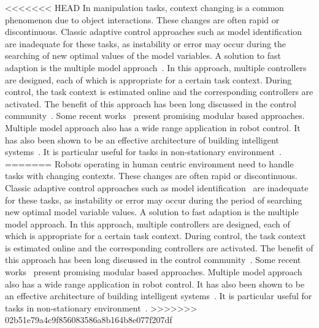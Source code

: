 <<<<<<< HEAD
In manipulation tasks, context changing is a common phenomenon due to object interactions. These changes are often rapid or discontinuous. Classic adaptive control approaches such as model identification~\cite{khalil2004modeling} are inadequate for these tasks, as instability or error may occur during the searching of new optimal values of the model variables. A solution to fast adaption is the multiple model approach~\cite{narendra1995adaptation}. In this approach, multiple controllers are designed, each of which is appropriate for a certain task context. During control, the task context is estimated online and the corresponding controllers are activated. The benefit of this approach has been long discussed in the control community~\cite{jacobs1991adaptive,narendra1997adaptive}. Some recent works~\cite{fekri2007robust,kuipers2010multiple} present promising modular based approaches. Multiple model approach also has a wide range application in robot control. It has also been shown to be an effective architecture of building intelligent systems~\cite{bryson2004modular,BrysonMcG12}. It is particular useful for tasks in  non-stationary environment~\cite{sugimoto2012emosaic}.
=======
Robots operating in human centric environment need to handle tasks with changing contexts. These changes are often rapid or discontinuous. Classic adaptive control approaches such as model identification~\cite{khalil2004modeling} are inadequate for these tasks, as instability or error may occur during the period of searching new optimal model variable values. A solution to fast adaption is the multiple model approach. In this approach, multiple controllers are designed, each of which is appropriate for a certain task context. During control, the task context is estimated online and the corresponding controllers are activated. The benefit of this approach has been long discussed in the control community~\cite{jacobs1991adaptive,narendra1995adaptation,narendra1997adaptive}. Some recent works~\cite{fekri2007robust,kuipers2010multiple} present promising modular based approaches. Multiple model approach also has a wide range application in robot control. It has also been shown to be an effective architecture of building intelligent systems~\cite{bryson2004modular,BrysonMcG12}. It is particular useful for tasks in  non-stationary environment~\cite{petkos2006learning,sugimoto2012emosaic}.
>>>>>>> 02b51e79a4c9f856083586a8b164b8e077f207df



